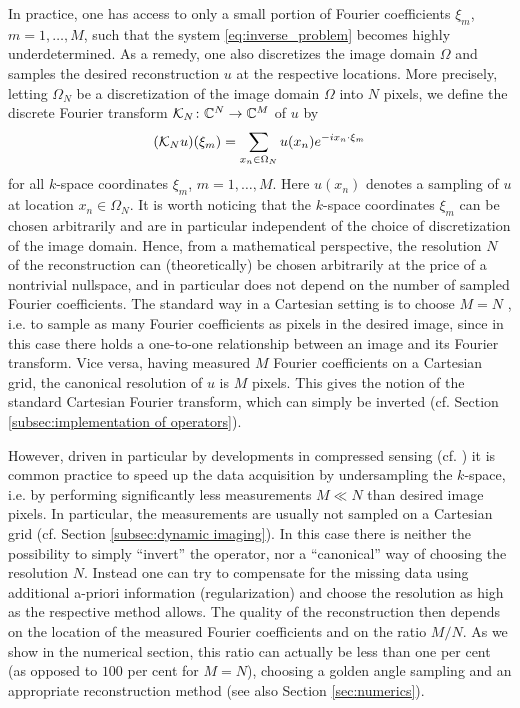In practice, one has access to only a small portion of Fourier coefficients $\xi_m$, $m = 1, \dots, M$, such that the system \eqref{eq:inverse_problem} becomes highly underdetermined. 
As a remedy, one also discretizes the image domain $\Omega$ and samples the desired reconstruction $u$ at the respective locations. 
More precisely, letting $\Omega_N$ be a discretization of the image domain $\Omega$ into $N$ pixels, we define the discrete Fourier transform $\mathcal{K}_N \colon \mathbb{C}^N \to \mathbb{C}^M$ of $u$ by 
\begin{align}\label{eq:fourier_transform}
  (\mathcal{K}_N u)(\xi_m) = \sum_{x_n \in \Omega_N} u(x_n) e^{-i x_n \cdot \xi_m} 
\end{align}
%
for all $k$-space coordinates $\xi_m$, $m=1,\dots,M$.
Here $u(x_n)$ denotes a sampling of $u$ at location $x_n \in \Omega_N$.
It is worth noticing that the $k$-space coordinates $\xi_m$ can be chosen arbitrarily and are in particular independent of the choice of discretization of the image domain.
Hence, from a mathematical perspective, the resolution $N$ of the reconstruction can (theoretically) be chosen arbitrarily at the price of a nontrivial nullspace, and in particular does not depend on the number of sampled Fourier coefficients.
The standard way in a Cartesian setting is to choose $M=N$ , i.e. to sample as many Fourier coefficients as pixels in the desired image, since in this case there holds a one-to-one relationship between an image and its Fourier transform. 
Vice versa, having measured $M$ Fourier coefficients on a Cartesian grid, the canonical resolution of $u$ is $M$ pixels. 
This gives the notion of the standard Cartesian Fourier transform, which can simply be inverted (cf. Section \ref{subsec:implementation of operators}).

However, driven in particular by developments in compressed sensing (cf. \cite{Lustig:Sparse,Lustig:ktSPARSE}) it is common practice to speed up the data acquisition by undersampling the $k$-space, i.e. by performing significantly less measurements $M \ll N$ than desired image pixels. 
In particular, the measurements are usually not sampled on a Cartesian grid (cf. Section \ref{subsec:dynamic imaging}).
In this case there is neither the possibility to simply ``invert'' the operator, nor a ``canonical'' way of choosing the resolution $N$. 
Instead one can try to compensate for the missing data using additional a-priori information (regularization) and choose the resolution as high as the respective method allows. 
The quality of the reconstruction then depends on the location of the measured Fourier coefficients and on the ratio $M/N$. 
As we show in the numerical section, this ratio can actually be less than one per cent (as opposed to $100$ per cent for $M=N$), choosing a golden angle sampling and an appropriate reconstruction method (see also Section \ref{sec:numerics}).


